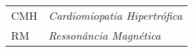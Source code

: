\begin{abreviaturas}
                    
                    \linebreak
                    \linebreak

\begin {raggedright}
\begin{tabular}{p{3cm} p{10cm}}

CMH & \textit{Cardiomiopatia Hipertrófica}\\
RM & \textit{Ressonância Magnética} \\


\end{tabular}
\end{raggedright}
\end{abreviaturas}

